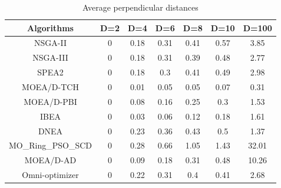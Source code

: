 \documentclass[conference]{IEEEtran}
\begin{document}
\begin{table}[htbp]
\centering
\caption{Average perpendicular distances}
\begin{tabular}{@{}ccccccc@{}}
\toprule
Algorithms         & D=2 & D=4                           & D=6                           & D=8                           & D=10                          & D=100                         \\ \midrule
NSGA-II            & 0  & 0.18                         & 0.31                         & 0.41                         & 0.57                         & 3.85                         \\
NSGA-III           & 0  & 0.18                         & 0.31                         & 0.39                         & 0.48                         & 2.77                         \\
SPEA2              & 0  & 0.18                         & 0.3                          & 0.41                         & 0.49                         & 2.98                         \\
MOEA/D-TCH         & 0  & \cellcolor[HTML]{F8FF00}0.01 & \cellcolor[HTML]{F8FF00}0.05 & \cellcolor[HTML]{F8FF00}0.05 & \cellcolor[HTML]{F8FF00}0.07 & \cellcolor[HTML]{F8FF00}0.31 \\
MOEA/D-PBI         & 0  & 0.08                         & 0.16                         & 0.25                         & 0.3                          & 1.53                         \\
IBEA               & 0  & 0.03                         & 0.06                         & 0.12                         & 0.18                         & 1.61                         \\
DNEA               & 0  & 0.23                         & 0.36                         & 0.43                         & 0.5                          & 1.37                         \\
MO\_Ring\_PSO\_SCD & 0  & 0.28                         & 0.66                         & 1.05                         & 1.43                         & 32.01                        \\
MOEA/D-AD          & 0  & 0.09                         & 0.18                         & 0.31                         & 0.48                         & 10.26                        \\
Omni-optimizer     & 0  & 0.22                      & 0.31                         & 0.4                          & 0.41                         & 2.68                         \\ \bottomrule
\end{tabular}
\label{table: Perpendicular Distance}
\end{table}
\end{document}

